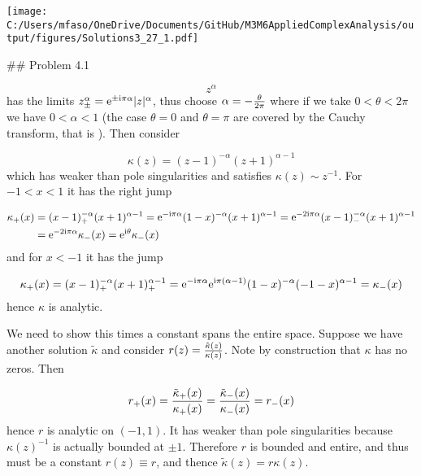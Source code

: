 \documentclass[12pt,landscape]{article}
\def\I{ {\rm i} }
\def\E{ {\rm e} }
\begin{document}
{\texttt{[image: C:/Users/mfaso/OneDrive/Documents/GitHub/M3M6AppliedComplexAnalysis/output/figures/Solutions3\_27\_1.pdf]}

\#\# Problem 4.1

\[
z^\alpha
\]
has the limits $z_\pm^\alpha = \E^{\pm \I  \pi \alpha} |z|^\alpha$, thus choose $\alpha = -{\theta \over 2\pi}$ where if we take $0 < \theta < 2\pi$ we have $0 < \alpha < 1$ (the case $\theta = 0$ and $\theta = \pi$ are covered by the Cauchy transform, that is ). Then consider

\[
\kappa(z) = (z-1)^{-\alpha} (z+1)^{\alpha-1}
\]
which has weaker than pole singularities and satisfies $\kappa(z) \sim z^{-1}$. For $-1 < x < 1$ it has the right jump

\begin{align*}
\kappa_+(x) &= (x-1)_+^{-\alpha} (x+1)^{\alpha - 1}  = \E^{-\I \pi \alpha} (1-x)^{-\alpha} (x+1)^{\alpha-1} = \E^{-2\I \pi \alpha} (x-1)_-^{-\alpha} (x+1)^{\alpha-1}\\
& = \E^{-2 \I \pi \alpha} \kappa_-(x)= \E^{\I \theta} \kappa_-(x)
\end{align*}
and  for $x < -1$ it has the jump

\[
\kappa_+(x) = (x-1)_+^{-\alpha} (x+1)_+^{\alpha-1}  = \E^{-\I \pi \alpha}\E^{\I \pi (\alpha-1)} (1-x)^{-\alpha} (-1-x)^{\alpha-1} =  \kappa_-(x)
\]
hence $\kappa$ is analytic.

We need to show this times a constant spans the entire space. Suppose we have another solution $\tilde \kappa$ and consider $r(z) = {\tilde \kappa(z) \over \kappa(z)}$. Note by construction that $\kappa$ has no zeros. Then

\[
r_+(x) = {\tilde\kappa_+(x) \over \kappa_+(x)} = {\tilde\kappa_-(x) \over \kappa_-(x)} = r_-(x)
\]
hence $r$ is analytic on $(-1,1)$. It has weaker than pole singularities because $\kappa(z)^{-1}$ is actually bounded at $\pm 1$. Therefore $r$ is bounded and entire, and thus must be a constant $r(z) \equiv r$, and thence $\tilde \kappa(z) = r \kappa(z)$.


}
\end{document}
